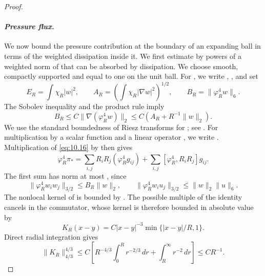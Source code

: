 \begin{proof}
\paragraph{\normalfont\itshape Pressure flux.}
We now bound the pressure contribution at the boundary of an expanding ball in terms of the
weighted dissipation inside it. We first estimate
 by powers of a weighted
 norm of  that can be absorbed by
dissipation. We choose  smooth, compactly
supported and equal to one on the unit ball. For , we write
, ,
and set
\[
  E_R=\int\chi_R|w|^2,\qquad
  A_R=\left(\int\chi_R|\nabla w|^2\right)^{1/2},\qquad
  B_R=\|\varphi_R^4w\|_6.
\]
The Sobolev inequality and the product rule imply
\begin{equation}
  B_R\leq C\|\nabla(\varphi_R^4w)\|_2
  \leq C(A_R+R^{-1}\|w\|_2).
\tag{10.17}\label{eq:10.17}
\end{equation}
We use the standard  boundedness of Riesz transforms for
; see \cite{ref-20}. For multiplication by a scalar
function  and a linear operator , we write
. Multiplication of \eqref{eq:10.16} by
 then gives
\begin{equation}
  \varphi_R^4\pi_*
  =\sum_{i,j}R_iR_j(\varphi_R^4g_{ij})
   +\sum_{i,j}[\varphi_R^4,R_iR_j]g_{ij}.
\tag{10.18}\label{eq:10.18}
\end{equation}
The first sum has  norm at most
, since
\[
  \|\varphi_R^4w_iw_j\|_{3/2}\leq B_R\|w\|_2,\qquad
  \|\varphi_R^4w_iu_j\|_{3/2}\leq\|w\|_2\|u\|_6.
\]
The nonlocal kernel of  is bounded by
. The possible multiple of the identity cancels in the
commutator, whose kernel is therefore bounded in absolute value by
\[
  K_R(x-y)=C|x-y|^{-3}\min\{|x-y|/R,1\}.
\]
Direct radial integration gives
\[
  \|K_R\|_{4/3}^{4/3}
  \leq C\left[
    R^{-4/3}\int_0^R r^{-2/3}\,dr+\int_R^\infty r^{-2}\,dr
  \right]
  \leq CR^{-1}.
\]


\end{proof}
